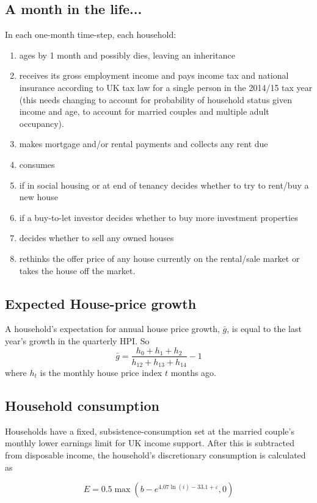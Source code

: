 \documentclass{article}
\begin{document}
\subsection{A month in the life...}
In each one-month time-step, each household:
\begin{enumerate}
\item ages by 1 month and possibly dies, leaving an inheritance
\item receives its gross employment income and pays income tax and national insurance according to UK tax law for a single person in the 2014/15 tax year (this needs changing to account for probability of household status given income and age, to account for married couples and multiple adult occupancy).
\item makes mortgage and/or rental payments and collects any rent due
\item consumes
\item if in social housing or at end of tenancy decides whether to try to rent/buy a new house
\item if a buy-to-let investor decides whether to buy more investment properties
\item decides whether to sell any owned houses
\item rethinks the offer price of any house currently on the rental/sale market or takes the house off the market.
\end{enumerate}


\subsection{Expected House-price growth}
A household's expectation for annual house price growth, $\bar{g}$, is equal to the last year's growth in the quarterly HPI. So
\[
\bar{g} = \frac{h_0 + h_{1} + h_{2}}{h_{12} + h_{13} + h_{14}} - 1
\]
where $h_t$ is the monthly house price index $t$ months ago.

\subsection{Household consumption}

Households have a fixed, subsistence-consumption set at the married couple's monthly lower earnings limit for UK income support. After this is subtracted from disposable income, the household's discretionary consumption is calculated as

\begin{equation}
E=0.5 \max \left( b-e^{4.07\ln (i)-33.1+\varepsilon },0\right)
\label{consumption}
\end{equation}
\end{document}
